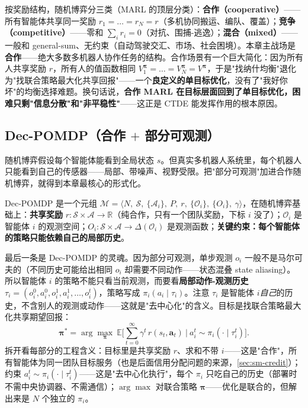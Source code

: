 按奖励结构，随机博弈分三类（MARL 的顶层分类）：\textbf{合作（cooperative）}——所有智能体共享同一奖励 $r_1=\dots=r_N=r$（多机协同搬运、编队、覆盖）；\textbf{竞争（competitive）}——零和 $\sum_i r_i=0$（对抗、围捕-逃逸）；\textbf{混合（mixed）}——一般和 general-sum、无约束（自动驾驶交汇、市场、社会困境）。本章主战场是\textbf{合作}——绝大多数多机器人协作任务的结构。合作场景有一个巨大简化：因为所有人共享奖励 $r$，所有人的值函数相同 $V_1^{\boldsymbol{\pi}}=\dots=V_N^{\boldsymbol{\pi}}=V^{\boldsymbol{\pi}}$，于是"找纳什均衡"退化为"找联合策略最大化共享回报"——一个\textbf{良定义的单目标优化}，没有了"我好你坏"的均衡选择难题。换句话说，\textbf{合作 MARL 在目标层面回到了单目标优化，困难只剩"信息分散"和"非平稳性"}——这正是 CTDE 能发挥作用的根本原因。

\subsection{Dec-POMDP（合作 \texorpdfstring{$+$}{+} 部分可观测）}

随机博弈假设每个智能体能看到全局状态 $s$。但真实多机器人系统里，每个机器人只能看到自己的传感器——局部、带噪声、视野受限。把"部分可观测"加进合作随机博弈，就得到本章最核心的形式化。

\begin{definition}\label{def:sm-decpomdp}
Dec-POMDP 是一个元组 $\mathcal{M}=\langle N,\ \mathcal{S},\ \{\mathcal{A}_i\},\ P,\ r,\ \{\mathcal{O}_i\},\ \{O_i\},\ \gamma\rangle$，在随机博弈基础上：\textbf{共享奖励} $r:\mathcal{S}\times\boldsymbol{\mathcal{A}}\to\mathbb{R}$（纯合作，只有一个团队奖励，下标 $i$ 没了）；$\mathcal{O}_i$ 是智能体 $i$ 的观测空间；$O_i:\mathcal{S}\times\boldsymbol{\mathcal{A}}\to\Delta(\mathcal{O}_i)$ 是观测函数；\textbf{关键约束：每个智能体的策略只能依赖自己的局部历史}。
\end{definition}

最后一条是 Dec-POMDP 的灵魂。因为部分可观测，单步观测 $o_i$ 一般不是马尔可夫的（不同历史可能给出相同 $o_i$ 却需要不同动作——状态混叠 state aliasing）。所以智能体 $i$ 的策略不能只看当前观测，而要看\textbf{局部动作-观测历史} $\tau_i=(o_i^0,a_i^0,o_i^1,a_i^1,\dots,o_i^t)$，策略写成 $\pi_i(a_i\mid\tau_i)$。注意 $\tau_i$ 是智能体 $i$\emph{自己}的历史，不含别人的观测或动作——这就是"去中心化"的含义。目标是找联合策略最大化共享期望回报：
\begin{equation}
  \boldsymbol{\pi}^*=\arg\max_{\boldsymbol{\pi}}\ \mathbb{E}\Big[\sum_{t=0}^\infty\gamma^t\,r(s_t,\mathbf{a}_t)\ \Big|\ a_i^t\sim\pi_i(\cdot\mid\tau_i^t)\Big].
  \label{eq:sm-decpomdp-obj}
\end{equation}
拆开看每部分的工程含义：目标里是共享奖励 $r$、求和不带 $i$——这是"合作"，所有智能体为同一团队目标服务（也是后面信用分配问题的来源，\cref{sec:sm-credit}）；约束 $a_i^t\sim\pi_i(\cdot\mid\tau_i^t)$——这是"去中心化执行"，每个 $\pi_i$ 只吃自己的历史（部署时不需中央协调器、不需通信）；$\arg\max$ 对联合策略 $\boldsymbol{\pi}$——优化是联合的，但解出来是 $N$ 个独立的 $\pi_i$。

